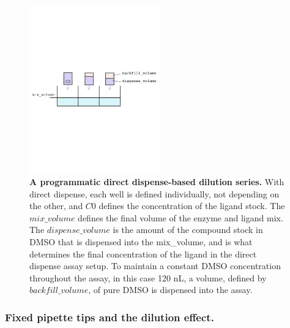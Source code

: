 \documentclass[aps,pre,twocolumn,nofootinbib,superscriptaddress,linenumbers]{revtex4-1}
\begin{document}
\begin{figure}[tb]
    \includegraphics[trim={0 9cm 0 9cm},clip,width=0.5\textwidth]{../figures/direct_dispense.pdf}

  \caption{{\bf A programmatic direct dispense-based dilution series.}
  With direct dispense, each well is defined individually, not depending on the other, and $C0$ defines the concentration of the ligand stock. The $mix\_volume$ defines the final volume of the enzyme and ligand mix. 
  The $dispense\_volume$ is the amount of the compound stock in DMSO that is dispensed into the mix\_volume, and is what determines the final concentration of the ligand in the direct dispense assay setup. 
  To maintain a constant DMSO concentration throughout the assay, in this case 120 nL, a volume, defined by $backfill\_volume$, of pure DMSO is dispensed into the assay.
  }
  \label{fig:direct_dispense}
\end{figure}

\subsubsection*{Fixed pipette tips and the dilution effect.}
\end{document}
